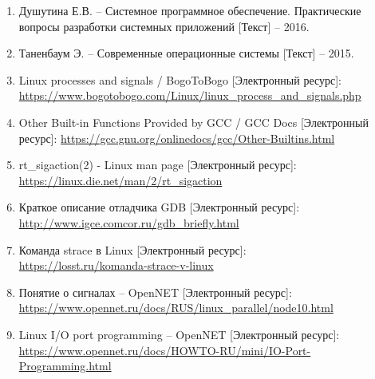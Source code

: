 \begin{enumerate}
	\item Душутина Е.В. -- Системное программное обеспечение. Практические вопросы разработки системных приложений [Текст] -- 2016.
	\item Таненбаум Э. -- Современные операционные системы [Текст] -- 2015.
	\item Linux processes and signals / BogoToBogo [Электронный ресурс]:\\
		{\small\url{https://www.bogotobogo.com/Linux/linux_process_and_signals.php}}
	\item Other Built-in Functions Provided by GCC / GCC Docs [Электронный ресурс]:
		{\small\url{https://gcc.gnu.org/onlinedocs/gcc/Other-Builtins.html}}
	\item rt\_sigaction(2) - Linux man page [Электронный ресурс]:\\
		{\small\url{https://linux.die.net/man/2/rt_sigaction}}
	\item Краткое описание отладчика GDB [Электронный ресурс]:\\
		{\small\url{http://www.igce.comcor.ru/gdb_briefly.html}}
	\item Команда strace в Linux [Электронный ресурс]:\\
		{\small\url{https://losst.ru/komanda-strace-v-linux}}
	\item Понятие о сигналах -- OpenNET [Электронный ресурс]:\\
		{\small\url{https://www.opennet.ru/docs/RUS/linux_parallel/node10.html}}
	\item Linux I/O port programming -- OpenNET [Электронный ресурс]:\\
		{\small\url{https://www.opennet.ru/docs/HOWTO-RU/mini/IO-Port-Programming.html}}
\end{enumerate}


